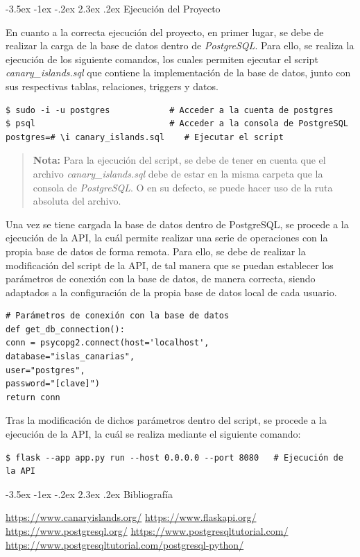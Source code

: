 \documentclass[11pt]{report}
\makeatletter
\renewcommand\chapter{\@startsection{chapter}{0}{\z@}%
    {-3.5ex \@plus -1ex \@minus -.2ex}%
    {2.3ex \@plus.2ex}%
    {\normalfont\Large\bfseries}}
\makeatother
\begin{document}
\chapter{Ejecución del Proyecto}

En cuanto a la correcta ejecución del proyecto, en primer lugar, se debe de realizar la carga de la base de datos dentro de \emph{PostgreSQL}. Para ello, se realiza la ejecución de los siguiente comandos, los cuales permiten ejecutar el script \emph{canary\_islands.sql} que contiene la implementación de la base de datos, junto con sus respectivas tablas, relaciones, triggers y datos.

\begin{verbatim}
$ sudo -i -u postgres            # Acceder a la cuenta de postgres
$ psql                           # Acceder a la consola de PostgreSQL
postgres=# \i canary_islands.sql    # Ejecutar el script
\end{verbatim}

\begin{quote}
\textbf{Nota:} Para la ejecución del script, se debe de tener en cuenta que el archivo \emph{canary\_islands.sql} debe de estar en la misma carpeta que la consola de \emph{PostgreSQL}. O en su defecto, se puede hacer uso de la ruta absoluta del archivo.
\end{quote}

Una vez se tiene cargada la base de datos dentro de PostgreSQL, se procede a la ejecución de la API, la cuál permite realizar una serie de operaciones con la propia base de datos de forma remota. Para ello, se debe de realizar la modificación del script de la API, de tal manera que se puedan establecer los parámetros de conexión con la base de datos, de manera correcta, siendo adaptados a la configuración de la propia base de datos local de cada usuario.

\begin{verbatim}
# Parámetros de conexión con la base de datos
def get_db_connection():
conn = psycopg2.connect(host='localhost',
database="islas_canarias",
user="postgres",
password="[clave]")
return conn
\end{verbatim}

Tras la modificación de dichos parámetros dentro del script, se procede a la ejecución de la API, la cuál se realiza mediante el siguiente comando:

\begin{verbatim}
$ flask --app app.py run --host 0.0.0.0 --port 8080   # Ejecución de la API
\end{verbatim}

\chapter{Bibliografía}
\begin{thebibliography}{99}
       \url{https://www.canaryislands.org/}
       \url{https://www.flaskapi.org/}
       \url{https://www.postgresql.org/}
       \url{https://www.postgresqltutorial.com/}
       \url{https://www.postgresqltutorial.com/postgresql-python/}

\end{thebibliography}
\end{document}
